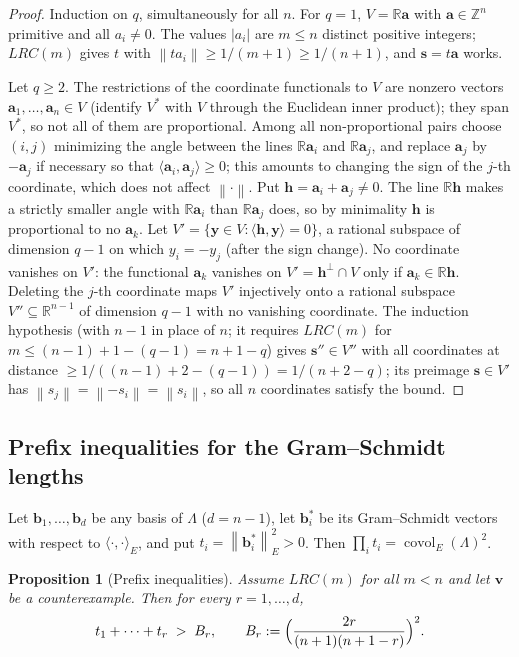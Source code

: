 \documentclass[11pt]{article}
\newtheorem{proposition}[theorem]{Proposition}
\theoremstyle{definition}
\theoremstyle{remark}
\newcommand{\Z}{\mathbb{Z}}
\newcommand{\R}{\mathbb{R}}
\newcommand{\vct}[1]{\mathbf{#1}}
\newcommand{\nearest}[1]{\left\lVert #1\right\rVert}
\newcommand{\Enorm}[1]{\left\lVert #1\right\rVert_{E}}
\DeclareMathOperator{\covol}{covol}
\begin{document}
\begin{proof}
Induction on $q$, simultaneously for all $n$.  For $q=1$, $V=\R\vct{a}$
with $\vct{a}\in\Z^n$ primitive and all $a_i\neq0$.  The values $|a_i|$
are $m\leq n$ distinct positive integers;
$LRC(m)$ gives $t$ with $\nearest{ta_i}\geq1/(m+1)\geq1/(n+1)$, and
$\vct{s}=t\vct{a}$ works.

Let $q\geq2$.  The restrictions of the coordinate functionals to $V$ are
nonzero vectors $\vct{a}_1,\ldots,\vct{a}_n\in V$ (identify $V^{*}$ with
$V$ through the Euclidean inner product); they span $V^{*}$, so not all of
them are proportional.  Among all non-proportional pairs choose $(i,j)$
minimizing the angle between the lines $\R\vct{a}_i$ and $\R\vct{a}_j$,
and replace $\vct{a}_j$ by $-\vct{a}_j$ if necessary so that
$\langle\vct{a}_i,\vct{a}_j\rangle\geq0$; this amounts to changing the
sign of the $j$-th coordinate, which does not affect $\nearest{\cdot}$.
Put $\vct{h}=\vct{a}_i+\vct{a}_j\neq0$.  The line $\R\vct{h}$ makes a
strictly smaller angle with $\R\vct{a}_i$ than $\R\vct{a}_j$ does, so by
minimality $\vct{h}$ is proportional to no $\vct{a}_k$.  Let
$V'=\{\vct{y}\in V:\langle\vct{h},\vct{y}\rangle=0\}$, a rational
subspace of dimension $q-1$ on which $y_i=-y_j$ (after the sign change).
No coordinate vanishes on $V'$: the functional $\vct{a}_k$ vanishes on
$V'=\vct{h}^{\perp}\cap V$ only if $\vct{a}_k\in\R\vct{h}$.  Deleting the
$j$-th coordinate maps $V'$ injectively onto a rational subspace
$V''\subseteq\R^{n-1}$ of dimension $q-1$ with no vanishing coordinate.
The induction hypothesis (with $n-1$ in place of $n$; it requires
$LRC(m)$ for $m\leq(n-1)+1-(q-1)=n+1-q$) gives $\vct{s}''\in V''$ with all
coordinates at distance $\geq1/((n-1)+2-(q-1))=1/(n+2-q)$; its preimage
$\vct{s}\in V'$ has $\nearest{s_j}=\nearest{-s_i}=\nearest{s_i}$, so all
$n$ coordinates satisfy the bound.
\end{proof}

\subsection{Prefix inequalities for the Gram--Schmidt lengths}

Let $\vct{b}_1,\ldots,\vct{b}_d$ be any basis of $\Lambda$ ($d=n-1$), let
$\vct{b}_i^{*}$ be its Gram--Schmidt vectors with respect to
$\langle\cdot,\cdot\rangle_E$, and put $t_i=\Enorm{\vct{b}_i^{*}}^2>0$.
Then $\prod_it_i=\covol_E(\Lambda)^2$.

\begin{proposition}[Prefix inequalities]\label{prop:prefix}
Assume $LRC(m)$ for all $m<n$ and let $\vct{v}$ be a counterexample.  Then
for every $r=1,\ldots,d$,
\begin{equation}\label{eq:prefix}
  t_1+\cdots+t_r\;>\;B_r,\qquad
  B_r:=\Bigl(\frac{2r}{(n+1)(n+1-r)}\Bigr)^{2}.
\end{equation}
\end{proposition}
\end{document}
